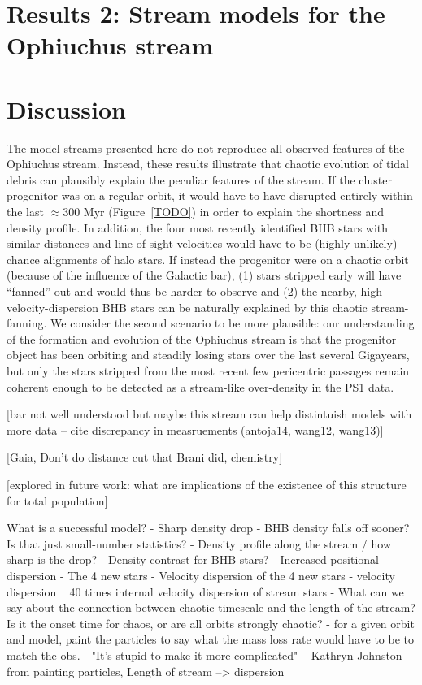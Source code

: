 \documentclass[letterpaper,12pt,preprint]{aastex}
\begin{document}
\section{Results 2: Stream models for the Ophiuchus stream}

\section{Discussion}\label{sec:discussion}

The model streams presented here do not reproduce all observed features of the Ophiuchus stream. Instead, these results illustrate that chaotic evolution of tidal debris can plausibly explain the peculiar features of the stream. If the cluster progenitor was on a regular orbit, it would have to have disrupted entirely within the last $\approx$300 Myr (Figure~\ref{TODO}) in order to explain the shortness and density profile. In addition, the four most recently identified BHB stars with similar distances and line-of-sight velocities would have to be (highly unlikely) chance alignments of halo stars. If instead the progenitor were on a chaotic orbit (because of the influence of the Galactic bar), (1) stars stripped early will have ``fanned'' out and would thus be harder to observe and (2) the nearby, high-velocity-dispersion BHB stars can be naturally explained by this chaotic stream-fanning. We consider the second scenario to be more plausible: our understanding of the formation and evolution of the Ophiuchus stream is that the progenitor object has been orbiting and steadily losing stars over the last several Gigayears, but only the stars stripped from the most recent few pericentric passages remain coherent enough to be detected as a stream-like over-density in the PS1 data.

[bar not well understood but maybe this stream can help distintuish models with more data -- cite discrepancy in measruements (antoja14, wang12, wang13)]

[Gaia, Don't do distance cut that Brani did, chemistry]

[explored in future work: what are implications of the existence of this structure for total population]

What is a successful model?
- Sharp density drop
	- BHB density falls off sooner? Is that just small-number statistics?
	- Density profile along the stream / how sharp is the drop?
	- Density contrast for BHB stars?
- Increased positional dispersion
	- The 4 new stars
- Velocity dispersion of the 4 new stars
	- velocity dispersion ~ 40 times internal velocity dispersion of stream stars
- What can we say about the connection between chaotic timescale and the length of the stream? Is it the onset time for chaos, or are all orbits strongly chaotic?
	- for a given orbit and model, paint the particles to say what the mass loss rate would have to be to match the obs.
- "It's stupid to make it more complicated" -- Kathryn Johnston
- from painting particles, Length of stream --> dispersion
\end{document}
